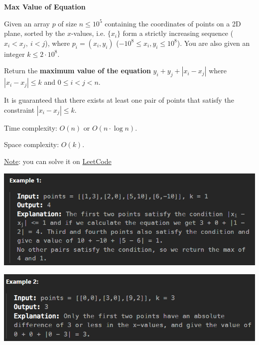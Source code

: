 \begin{problem}\textbf{Max Value of Equation}

    Given an array $p$ of size $n \leq 10^5$ containing the coordinates of points on a 2D plane, sorted by the $x$-values, i.e. $\{ x_i \}$ form a strictly increasing sequence ($x_i < x_j, \ i < j$), where $p_i = (x_i, y_i)$ ($-10^8 \leq x_i, y_i \leq 10^8$). You are also given an integer $k \leq 2\cdot 10^8$.

    Return the \textbf{maximum value of the equation} $y_i + y_j + |x_i - x_j|$ where $|x_i - x_j| \leq k$ and $0 \leq i < j < n$.

    It is guaranteed that there exists at least one pair of points that satisfy the constraint $|x_i - x_j| \leq k$.

    Time complexity: $O(n)$ or $O(n \cdot \log{n})$.

    Space complexity: $O(k)$.\newline

    \underline{Note}: you can solve it on \href{https://leetcode.com/problems/max-value-of-equation/description/}{LeetCode}

    \includegraphics[scale=0.6]{./assets/05-basic-data-structures/2-1.PNG}

    \includegraphics[scale=0.6]{./assets/05-basic-data-structures/2-2.PNG}

\end{problem}


